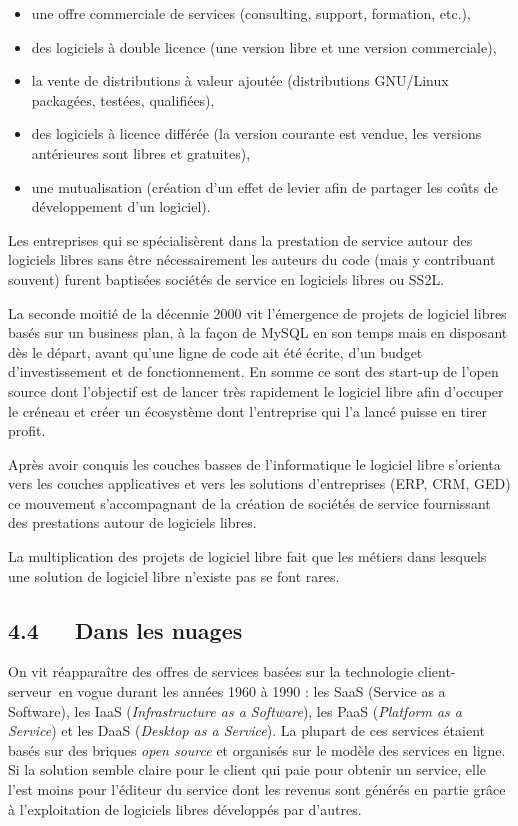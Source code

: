 \documentclass{FramateX}
\begin{document}
\begin{refsection}
\begin{itemize}
\item une offre commerciale de services (consulting, support, formation, etc.),
\item des logiciels à double licence (une version libre et une version commerciale),
\item la vente de distributions à valeur ajoutée (distributions GNU/Linux
packagées, testées, qualifiées),
\item des logiciels à licence différée (la version courante est vendue, les
versions antérieures sont libres et gratuites),
\item une mutualisation (création d'un effet de levier afin de partager les coûts de développement d'un logiciel).
\end{itemize}

Les entreprises qui se spécialisèrent dans la prestation de service
autour des logiciels libres sans être nécessairement les auteurs du
code (mais y contribuant souvent) furent baptisées sociétés de service
en logiciels libres ou SS2L.

La seconde moitié de la décennie 2000 vit l'émergence de projets de
logiciel libres basés sur un business plan, à la façon de MySQL en son
temps mais en disposant dès le départ, avant qu'une ligne de code ait
été écrite, d'un budget d'investissement et de fonctionnement. En somme
ce sont des start-up de l'open source dont l'objectif est de lancer
très rapidement le logiciel libre afin d'occuper le créneau et créer un
écosystème dont l'entreprise qui l'a lancé puisse en tirer profit.

Après avoir conquis les couches basses de l'informatique le logiciel libre
s'orienta vers les couches applicatives et vers les
solutions d'entreprises (ERP, CRM, GED) ce mouvement
s'accompagnant de la création de sociétés de service
fournissant des prestations autour de logiciels libres.

La multiplication des projets de logiciel libre fait que les métiers
dans lesquels une solution de logiciel libre n'existe pas se font
rares.

\subsection*{4.4~~~Dans les nuages}
{}

On vit réapparaître des offres de services basées sur la technologie
client-serveur~en vogue durant les années 1960 à 1990 : les SaaS
(Service as a Software), les IaaS (\textit{Infrastructure as a
Software}), les PaaS (\textit{Platform as a Service}) et les DaaS
(\textit{Desktop as a Service}). La plupart de ces services étaient
basés sur des briques \textit{open source} et organisés sur le modèle
des services en ligne. Si la solution semble claire pour le client qui
paie pour obtenir un service, elle l'est moins pour l'éditeur du
service dont les revenus sont générés en partie grâce à l'exploitation
de logiciels libres développés par d'autres.


\end{refsection}
\end{document}
